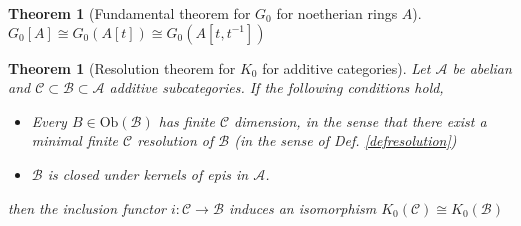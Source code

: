 \documentclass[12pt]{article}
\numberwithin{equation}{section}
\newcommand{\coker}{{\mathrm{coker}}}
\newcounter{dummy} \numberwithin{dummy}{section}
\newtheorem{theorem}[dummy]{Theorem}
\newtheorem{corollary}[dummy]{Corollary}
\newtheorem{example}[dummy]{Example}
\begin{document}
%	


	\begin{theorem}[Fundamental theorem for $G_0$ for noetherian rings $A$]\label{g0fund}
		$G_0[A] \cong G_0(A[t]) \cong G_0(A[t,t^{-1}])$
	\end{theorem}
	\begin{theorem}[Resolution theorem for $K_0$ for additive categories]
		Let $\mathcal{A}$ be abelian and $\mathcal{C} \subset \mathcal{B} \subset \mathcal{A}$ additive subcategories. If the following conditions hold,
		\begin{itemize}
			\item Every $B \in \mathrm{Ob}(\mathcal{B})$ has finite $\mathcal{C}$ dimension, in the sense that there exist a minimal finite $\mathcal{C}$ resolution of $\mathcal{B}$ (in the sense of Def. \ref{defresolution})
			\item $\mathcal{B}$ is closed under kernels of epis in $\mathcal{A}$.
		\end{itemize}
		then the inclusion functor $i:\mathcal{C } \to \mathcal{B}$ induces an isomorphism $K_0(\mathcal{C}) \cong K_0(\mathcal{B})$
	\end{theorem}
\end{document}
